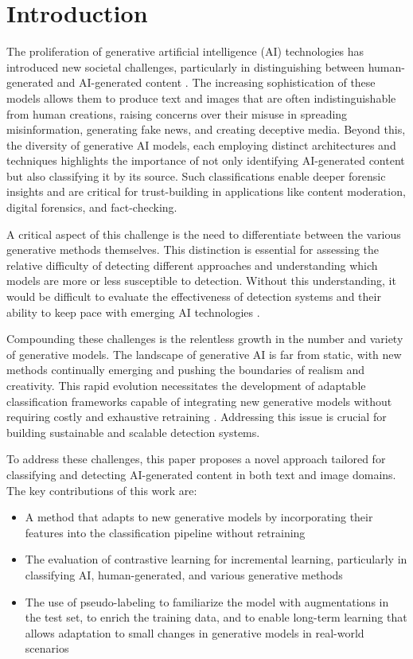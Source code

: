 \section{Introduction}
The proliferation of generative artificial intelligence (AI) technologies has introduced new societal challenges, particularly in distinguishing between human-generated and AI-generated content \cite{wang2023survey}. The increasing sophistication of these models allows them to produce text and images that are often indistinguishable from human creations, raising concerns over their misuse in spreading misinformation, generating fake news, and creating deceptive media. Beyond this, the diversity of generative AI models, each employing distinct architectures and techniques highlights the importance of not only identifying AI-generated content but also classifying it by its source. Such classifications enable deeper forensic insights and are critical for trust-building in applications like content moderation, digital forensics, and fact-checking.

A critical aspect of this challenge is the need to differentiate between the various generative methods themselves. This distinction is essential for assessing the relative difficulty of detecting different approaches and understanding which models are more or less susceptible to detection. Without this understanding, it would be difficult to evaluate the effectiveness of detection systems and their ability to keep pace with emerging AI technologies \cite{ojha2023towards}.

Compounding these challenges is the relentless growth in the number and variety of generative models. The landscape of generative AI is far from static, with new methods continually emerging and pushing the boundaries of realism and creativity. This rapid evolution necessitates the development of adaptable classification frameworks capable of integrating new generative models without requiring costly and exhaustive retraining \cite{lin2024detecting}. Addressing this issue is crucial for building sustainable and scalable detection systems.

To address these challenges, this paper proposes a novel approach tailored for classifying and detecting AI-generated content in both text and image domains. The key contributions of this work are:  
\begin{itemize}  
    \item A method that adapts to new generative models by incorporating their features into the classification pipeline without retraining
    \item The evaluation of contrastive learning for incremental learning, particularly in classifying AI, human-generated, and various generative methods
    \item The use of pseudo-labeling to familiarize the model with augmentations in the test set, to enrich the training data, and to enable long-term learning that allows adaptation to small changes in generative models in real-world scenarios
\end{itemize}  


